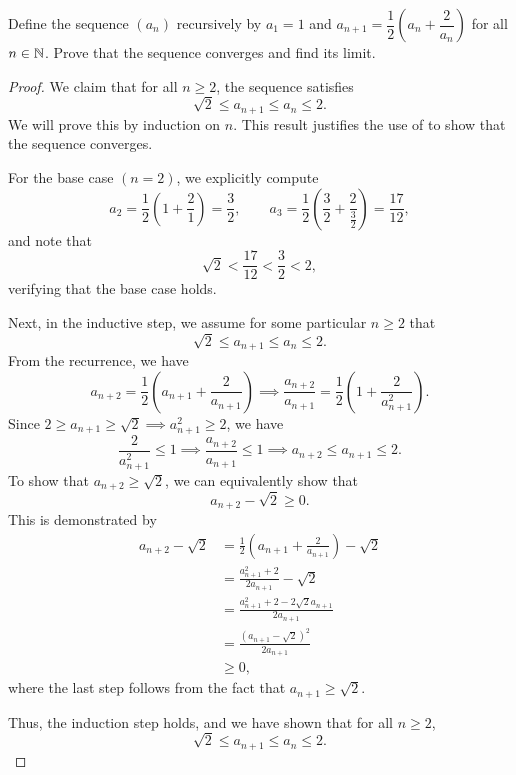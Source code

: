 \begin{problem}
  Define the sequence $(a_{n})$ recursively by $a_{1} = 1$ and $a_{n+1} = \dfrac{1}{2} \left( a_{n} + \dfrac{2}{a_{n}} \right)$ for all $n \in \mathbb{N}$. Prove that the sequence converges and find its limit.

  \begin{proof}
    We claim that for all $n \geq 2$, the sequence satisfies
    \[
      \sqrt{2} \leq a_{n+1} \leq a_{n} \leq 2.
    \]
    We will prove this by induction on $n$.
    This result justifies the use of  to show that the sequence converges.

    For the base case $(n = 2)$, we explicitly compute
    \[
      a_{2} = \frac{1}{2} \left(1 + \frac{2}{1} \right) = \frac{3}{2}, \qquad
      a_{3} = \frac{1}{2} \left( \frac{3}{2} + \frac{2}{\frac{3}{2}} \right) = \frac{17}{12},
    \]
    and note that
    \[
      \sqrt{2} < \frac{17}{12} < \frac{3}{2} < 2,
    \]
    verifying that the base case holds.

    Next, in the inductive step, we assume for some particular $n \geq 2$ that
    \[
      \sqrt{2} \leq a_{n+1} \leq a_n \leq 2.
    \]
    From the recurrence, we have
    \[
      a_{n+2} = \frac{1}{2} \left( a_{n+1} + \frac{2}{a_{n+1}} \right)
      \implies
      \frac{a_{n+2}}{a_{n+1}} = \frac{1}{2} \left( 1 + \frac{2}{a_{n+1}^2} \right).
    \]
    Since $2 \geq a_{n+1} \geq \sqrt{2} \implies a_{n+1}^{2} \geq 2$, we have 
    \[
      \frac{2}{a_{n+1}^2} \leq 1 \implies \frac{a_{n+2}}{a_{n+1}} \leq 1 \implies a_{n+2} \leq a_{n+1} \leq 2.
    \]
    To show that $a_{n+2} \geq \sqrt{2}$, we can equivalently show that
    \[
      a_{n+2} - \sqrt{2} \geq 0.
    \]
    This is demonstrated by
    \begin{align*}
      a_{n+2} - \sqrt{2} &= \frac{1}{2} \left( a_{n+1} + \frac{2}{a_{n+1}} \right) - \sqrt{2} \\
                         &= \frac{a_{n+1}^{2} + 2}{2a_{n+1}} - \sqrt{2} \\ 
                         &= \frac{a_{n+1}^{2} + 2 - 2\sqrt{2} a_{n+1}}{2 a_{n+1}} \\
                         &= \frac{(a_{n+1} - \sqrt{2})^2}{2 a_{n+1}} \\
                         &\geq 0,
    \end{align*}
    where the last step follows from the fact that $a_{n+1} \geq \sqrt{2}$.

    Thus, the induction step holds, and we have shown that for all $n \geq 2$,
    \[
      \sqrt{2} \leq a_{n+1} \leq a_n \leq 2.
    \]


\end{proof}
\end{problem}
